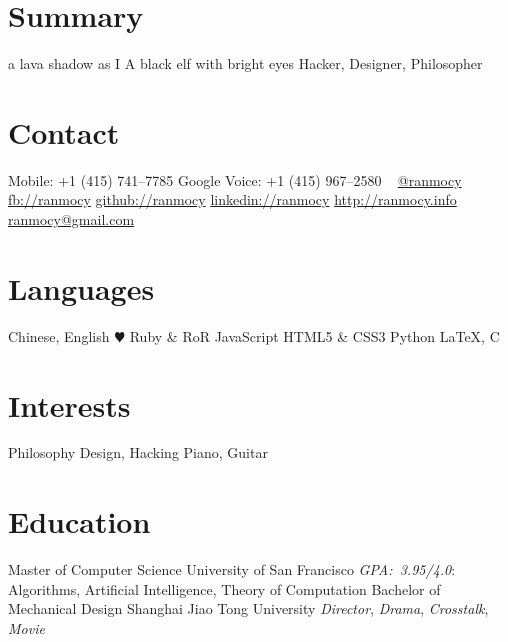 \documentclass[]{friggeri-cv} %
\begin{document}


\begin{aside} %
  \section{Summary}
  a lava shadow as I
  A black elf
  with bright eyes
  Hacker,
  Designer,
  Philosopher
  \section{Contact}
  Mobile:
  +1 (415) 741--7785
  Google Voice:
  +1 (415) 967--2580
  ~
  \href{https://twitter.com/ranmocy}{@ranmocy}
  \href{https://facebook.com/ranmocy}{fb://ranmocy}
  \href{https://github.com/ranmocy}{github://ranmocy}
  \href{http://www.linkedin.com/in/ranmocy}{linkedin://ranmocy}
  \href{http://ranmocy.info}{http://ranmocy.info}
  \href{mailto:ranmocy@gmail.com}{ranmocy@gmail.com}
  \section{Languages}
  Chinese, English
  {\color{red} $\varheartsuit$} Ruby \& RoR
  JavaScript
  HTML5 \& CSS3
  Python
  LaTeX, C
  \section{Interests}
  Philosophy
  Design, Hacking
  Piano, Guitar
\end{aside}


\section{Education}

\begin{entrylist}
  {Master \textnormal{of Computer Science}}
  {University of San Francisco}
  {
    \emph{GPA:~3.95/4.0}: Algorithms, Artificial Intelligence, Theory of Computation
  }
  {Bachelor \textnormal{of Mechanical Design}}
  {Shanghai Jiao Tong University}
  {
    \emph{Director}, \emph{Drama}, \emph{Crosstalk}, \emph{Movie}
  }
\end{entrylist}
\end{document}
